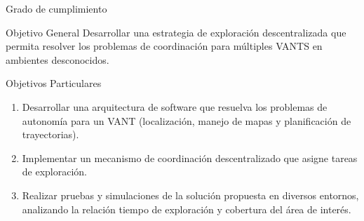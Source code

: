 \documentclass[24pt,aspectratio=169]{beamer}
\begin{document}
\begin{frame}{Grado de cumplimiento}
  \small
  \begin{block}{Objetivo General }
    \vspace{1mm}
    Desarrollar una estrategia de exploración descentralizada que permita resolver los problemas de coordinación para múltiples VANTS en ambientes desconocidos.
  \end{block}
  
  \begin{block}{Objetivos Particulares}
    \small{
      \begin{enumerate}
      \item Desarrollar una arquitectura de software que resuelva los problemas de autonomía para un VANT (localización, manejo de mapas y planificación de trayectorias).\\
      \item Implementar un mecanismo de coordinación descentralizado que asigne tareas de exploración. \\
      \item Realizar pruebas y simulaciones de la solución propuesta en diversos entornos, analizando la relación tiempo de exploración y cobertura del área de interés. \\
      \end{enumerate}
    }
  \end{block}
\end{frame}
\end{document}

